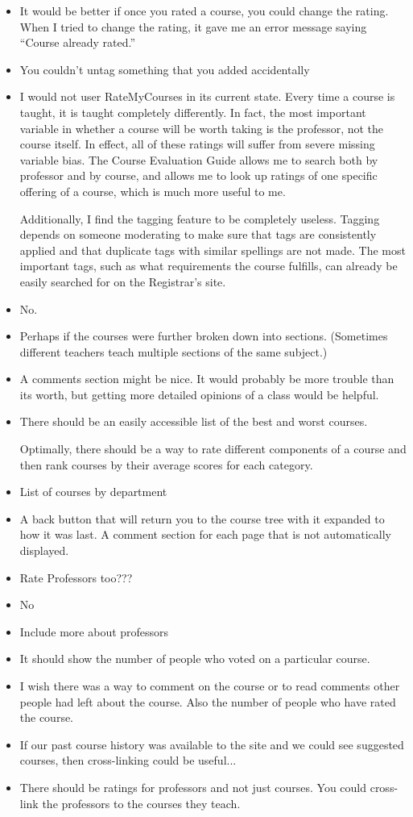 \documentclass[12pt]{report}
\begin{document}
\begin{itemize}
\item It would be better if once you rated a course, you could change the rating. When I tried to change the rating, it gave me an error message saying ``Course already rated.''
\item You couldn't untag something that you added accidentally
\item I would not user RateMyCourses in its current state. Every time a course is taught, it is taught completely differently. In fact, the most important variable in whether a course will be worth taking is the professor, not the course itself. In effect, all of these ratings will suffer from severe missing variable bias. The Course Evaluation Guide allows me to search both by professor and by course, and allows me to look up ratings of one specific offering of a course, which is much more useful to me.

Additionally, I find the tagging feature to be completely useless. Tagging depends on someone moderating to make sure that tags are consistently applied and that duplicate tags with similar spellings are not made. The most important tags, such as what requirements the course fulfills, can already be easily searched for on the Registrar's site.
\item No.
\item Perhaps if the courses were further broken down into sections. (Sometimes different teachers teach multiple sections of the same subject.)
\item A comments section might be nice. It would probably be more trouble than its worth, but getting more detailed opinions of a class would be helpful.
\item There should be an easily accessible list of the best and worst courses.

Optimally, there should be a way to rate different components of a course and then rank courses by their average scores for each category.
\item List of courses by department
\item A back button that will return you to the course tree with it expanded to how it was last. A comment section for each page that is not automatically displayed.
\item Rate Professors too???
\item No
\item Include more about professors
\item It should show the number of people who voted on a particular course.
\item I wish there was a way to comment on the course or to read comments other people had left about the course. Also the number of people who have rated the course.
\item If our past course history was available to the site and we could see suggested courses, then cross-linking could be useful...
\item There should be ratings for professors and not just courses. You could cross-link the professors to the courses they teach.
\end{itemize}
\end{document}
